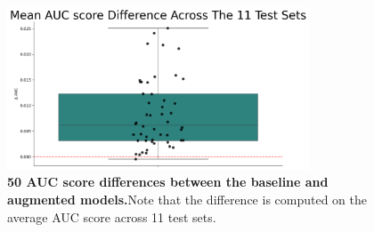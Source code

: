 \begin{figure}[H]
    \centering
    \includegraphics[width=0.8\textwidth]{assets/diffAUC10.png} 
    \caption{\textbf{50 AUC score differences between the baseline and augmented models.}Note that the difference is computed on the average AUC score across 11 test sets.}
\end{figure}


